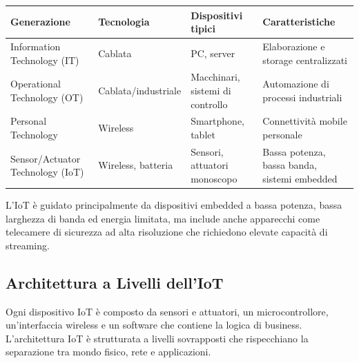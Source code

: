 \documentclass[
  italian,
  openany]{book}
\newcounter{none} %
\begin{document}
{\def\LTcaptype{none} %
\begin{longtable}[]{@{}
  >{\raggedright\arraybackslash}p{}
  >{\raggedright\arraybackslash}p{}
  >{\raggedright\arraybackslash}p{}
  >{\raggedright\arraybackslash}p{}@{}}
\toprule\noalign{}
\begin{minipage}[b]{\linewidth}\raggedright
Generazione
\end{minipage} & \begin{minipage}[b]{\linewidth}\raggedright
Tecnologia
\end{minipage} & \begin{minipage}[b]{\linewidth}\raggedright
Dispositivi tipici
\end{minipage} & \begin{minipage}[b]{\linewidth}\raggedright
Caratteristiche
\end{minipage} \\
\midrule\noalign{}
\endhead
\bottomrule\noalign{}
\endlastfoot
Information Technology (IT) & Cablata & PC, server & Elaborazione e
storage centralizzati \\
Operational Technology (OT) & Cablata/industriale & Macchinari, sistemi
di controllo & Automazione di processi industriali \\
Personal Technology & Wireless & Smartphone, tablet & Connettività
mobile personale \\
Sensor/Actuator Technology (IoT) & Wireless, batteria & Sensori,
attuatori monoscopo & Bassa potenza, bassa banda, sistemi embedded \\
\end{longtable}
}

L'IoT è guidato principalmente da dispositivi embedded a bassa potenza,
bassa larghezza di banda ed energia limitata, ma include anche
apparecchi come telecamere di sicurezza ad alta risoluzione che
richiedono elevate capacità di streaming.

\subsection{Architettura a Livelli
dell'IoT}\label{architettura-a-livelli-delliot}

Ogni dispositivo IoT è composto da sensori e attuatori, un
microcontrollore, un'interfaccia wireless e un software che contiene la
logica di business. L'architettura IoT è strutturata a livelli
sovrapposti che rispecchiano la separazione tra mondo fisico, rete e
applicazioni.
\end{document}
